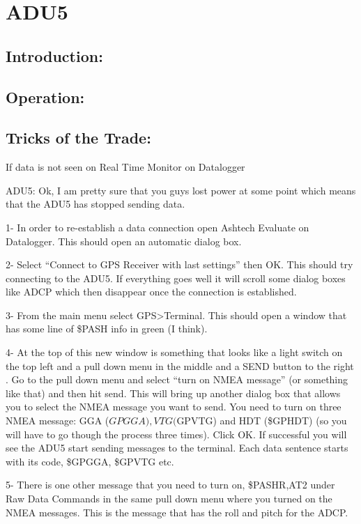 \documentclass[]{book}
\theoremstyle{definition}
\theoremstyle{definition}
\theoremstyle{definition}
\theoremstyle{remark}
\begin{document}
\section*{ADU5}\label{adu5}

\subsection{Introduction:}\label{introduction-1}

\subsection{Operation:}\label{operation}

\subsection{Tricks of the Trade:}\label{tricks-of-the-trade}

If data is not seen on Real Time Monitor on Datalogger

ADU5: Ok, I am pretty sure that you guys lost power at some point which
means that the ADU5 has stopped sending data.

1- In order to re-establish a data connection open Ashtech Evaluate on
Datalogger. This should open an automatic dialog box.

2- Select ``Connect to GPS Receiver with last settings'' then OK. This
should try connecting to the ADU5. If everything goes well it will
scroll some dialog boxes like ADCP which then disappear once the
connection is established.

3- From the main menu select GPS\textgreater{}Terminal. This should open
a window that has some line of \$PASH info in green (I think).

4- At the top of this new window is something that looks like a light
switch on the top left and a pull down menu in the middle and a SEND
button to the right . Go to the pull down menu and select ``turn on NMEA
message'' (or something like that) and then hit send. This will bring up
another dialog box that allows you to select the NMEA message you want
to send. You need to turn on three NMEA message: GGA
(\(GPGGA), VTG (\)GPVTG) and HDT (\$GPHDT) (so you will have to go
though the process three times). Click OK. If successful you will see
the ADU5 start sending messages to the terminal. Each data sentence
starts with its code, \$GPGGA, \$GPVTG etc.

5- There is one other message that you need to turn on, \$PASHR,AT2
under Raw Data Commands in the same pull down menu where you turned on
the NMEA messages. This is the message that has the roll and pitch for
the ADCP.
\end{document}
